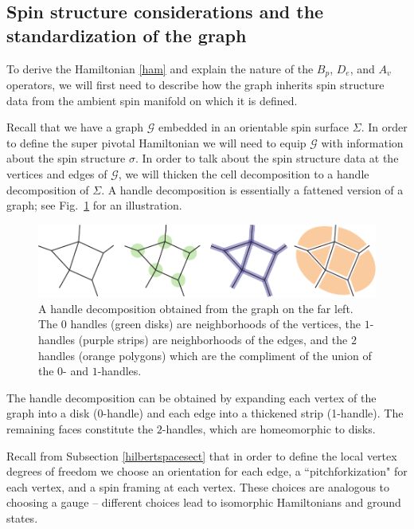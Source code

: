 \documentclass[12pt,a4paper]{article}
\newcommand{\mcg}{\mathcal{G}}
\begin{document}



\subsection{Spin structure considerations and the standardization of the graph} \label{standardized_handles}


To derive the Hamiltonian \eqref{ham} and explain the nature of the $B_p$, $D_e$, and $A_v$ operators, we will first need to describe how the graph inherits spin structure data from the ambient spin manifold on which it is defined. 

Recall that we have a graph $\mcg$ embedded in an orientable spin surface $\Sigma$.
In order to define the super pivotal Hamiltonian we will need to equip $\mcg$ with information about the spin structure $\sigma$. 
In order to talk about the spin structure data at the vertices and edges of $\mcg$, we will thicken the cell decomposition to a handle decomposition of $\Sigma$.
A handle decomposition is essentially a fattened version of a graph; see Fig.~\ref{HandleDecomposition} for an illustration.
\begin{figure}
  \includegraphics{HandleDecomposition.pdf}
  \caption{A handle decomposition obtained from the graph on the far left.
  The $0$ handles (green disks) are neighborhoods of the vertices, the $1$-handles (purple strips) are neighborhoods of the edges, and the $2$ handles (orange polygons) which are the compliment of the union of the $0$- and $1$-handles.}
  \label{HandleDecomposition}
\end{figure}
The handle decomposition can be obtained by expanding each vertex of the graph into a disk ($0$-handle) and each edge into
a thickened strip (1-handle).
The remaining faces constitute the $2$-handles, which are homeomorphic to disks.

Recall from Subsection \ref{hilbertspacesect} that 
in order to define the local vertex degrees of freedom we choose an orientation for each edge, a ``pitchforkization" for each vertex, and a spin framing at each vertex.
These choices are analogous to choosing a gauge -- different choices lead to isomorphic Hamiltonians and ground states.
\end{document}
